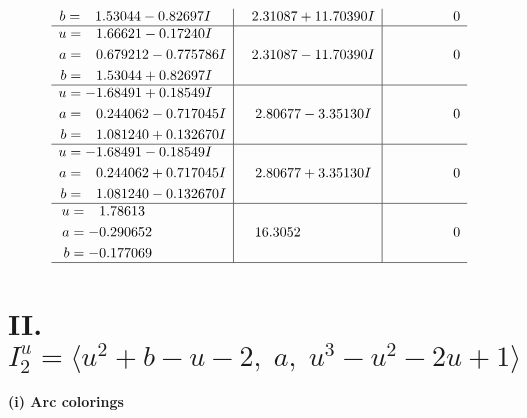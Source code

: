 \documentclass[1p]{elsarticle_modified}
\theoremstyle{definition}
\begin{document}
$$\begin{array}{c|c|c}
\begin{aligned}
b &= \phantom{-}1.53044 - 0.82697 I\end{aligned}
 & \phantom{-}2.31087 + 11.70390 I & \phantom{-0.000000 } 0 \\ \hline\begin{aligned}
u &= \phantom{-}1.66621 - 0.17240 I \\
a &= \phantom{-}0.679212 - 0.775786 I \\
b &= \phantom{-}1.53044 + 0.82697 I\end{aligned}
 & \phantom{-}2.31087 - 11.70390 I & \phantom{-0.000000 } 0 \\ \hline\begin{aligned}
u &= -1.68491 + 0.18549 I \\
a &= \phantom{-}0.244062 - 0.717045 I \\
b &= \phantom{-}1.081240 + 0.132670 I\end{aligned}
 & \phantom{-}2.80677 - 3.35130 I & \phantom{-0.000000 } 0 \\ \hline\begin{aligned}
u &= -1.68491 - 0.18549 I \\
a &= \phantom{-}0.244062 + 0.717045 I \\
b &= \phantom{-}1.081240 - 0.132670 I\end{aligned}
 & \phantom{-}2.80677 + 3.35130 I & \phantom{-0.000000 } 0 \\ \hline\begin{aligned}
u &= \phantom{-}1.78613\phantom{ +0.000000I} \\
a &= -0.290652\phantom{ +0.000000I} \\
b &= -0.177069\phantom{ +0.000000I}\end{aligned}
 & \phantom{-}16.3052\phantom{ +0.000000I} & \phantom{-0.000000 } 0\\
 \hline 
 \end{array}$$\newpage\newpage\renewcommand{\arraystretch}{1}
\centering \section*{II. $I^u_{2}= \langle u^2+b- u-2,\;a,\;u^3- u^2-2 u+1 \rangle$}
\flushleft \textbf{(i) Arc colorings}\\
\end{document}
